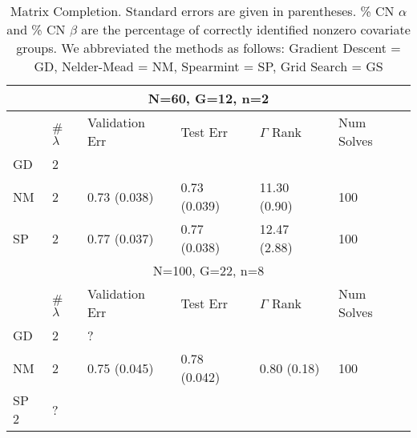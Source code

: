 \documentclass[12pt,letterpaper]{article}
\begin{document}
\begin{table}
	\caption{\label{table:matrix_completion} Matrix Completion. Standard errors are given in parentheses. \% CN $\alpha$ and \% CN $\beta$ are the percentage of correctly identified nonzero covariate groups. We abbreviated the methods as follows: Gradient Descent = GD, Nelder-Mead = NM, Spearmint = SP, Grid Search = GS}
	\centering
	\begin{tabular}{| l | l | l | l | l | l |}
		\hline
		\multicolumn{6}{|c|}{N=60, G=12, n=2}\\
		\hline
		& \# $\lambda$ & Validation Err & Test Err& $\Gamma$ Rank & Num Solves\\
		\hline
		GD & 2 &  \\
		\hline
		NM & 2 & 0.73 (0.038) & 0.73 (0.039) & 11.30 (0.90) & 100 \\
		\hline
		SP & 2 & 0.77 (0.037) & 0.77 (0.038) & 12.47 (2.88) & 100\\
		\hline
		\multicolumn{6}{|c|}{N=100, G=22, n=8}\\
		\hline
		& \# $\lambda$ & Validation Err & Test Err&  $\Gamma$ Rank & Num Solves\\
		\hline
		GD & 2 & ?\\
		\hline
		NM & 2 & 0.75 (0.045) & 0.78 (0.042) & 0.80 (0.18) & 100\\
		\hline
		SP 2 & ?\\
		\hline
	\end{tabular}
\end{table}



\end{document}
